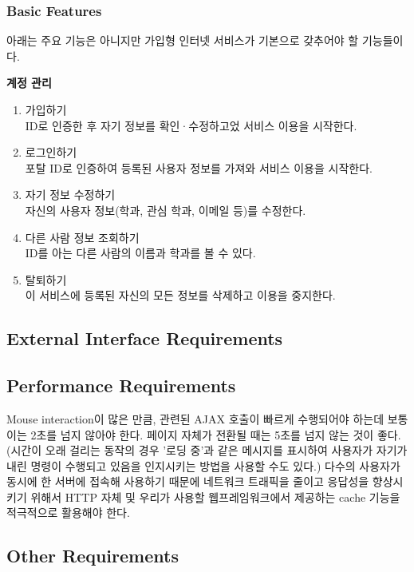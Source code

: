 \documentclass[a4paper,titlepage]{article}
\begin{document}
\subsubsection{Basic Features}
아래는 주요 기능은 아니지만 가입형 인터넷 서비스가 기본으로 갖추어야 할 기능들이다.
\begin{funcreq}
	\setcounter{enumi}{6}
	\item\textbf{계정 관리}
	\begin{enumerate}
		\item 가입하기\\
		ID로 인증한 후 자기 정보를 확인·수정하고었 서비스 이용을 시작한다. 
		\item 로그인하기\\ 
		포탈 ID로 인증하여 등록된 사용자 정보를 가져와 서비스 이용을 시작한다. 
		\item 자기 정보 수정하기\\
		자신의 사용자 정보(학과, 관심 학과, 이메일 등)를 수정한다. 
		\item 다른 사람 정보 조회하기\\
		ID를 아는 다른 사람의 이름과 학과를 볼 수 있다. 
		\item 탈퇴하기\\
		이 서비스에 등록된 자신의 모든 정보를 삭제하고 이용을 중지한다. 
	\end{enumerate}
\end{funcreq}

\subsection{External Interface Requirements}

\subsection{Performance Requirements}
Mouse interaction이 많은 만큼, 관련된 AJAX 호출이 빠르게 수행되어야 하는데 보통 이는 2초를 넘지 않아야 한다.
페이지 자체가 전환될 때는 5초를 넘지 않는 것이 좋다.
(시간이 오래 걸리는 동작의 경우 '로딩 중'과 같은 메시지를 표시하여 사용자가 자기가 내린 명령이 수행되고 있음을 인지시키는 방법을 사용할 수도 있다.)
다수의 사용자가 동시에 한 서버에 접속해 사용하기 때문에 네트워크 트래픽을 줄이고 응답성을 향상시키기 위해서 HTTP 자체 및 우리가 사용할 웹프레임워크에서 제공하는 cache 기능을 적극적으로 활용해야 한다.

\subsection{Other Requirements}
\end{document}
